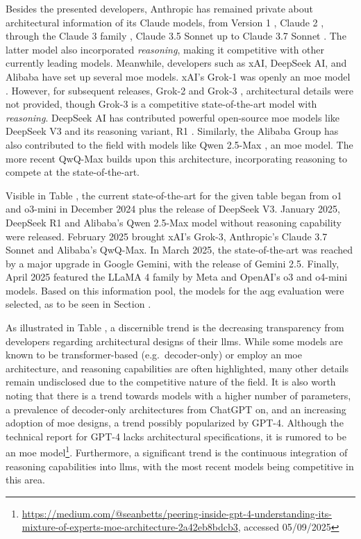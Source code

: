 Besides the presented developers, Anthropic has remained private about architectural information of its Claude models, from Version 1 \cite{anthropic_introducing_2023}, Claude 2 \cite{anthropic_claude_2023}, through the Claude 3 family \cite{anthropic_introducing_2024-1}, Claude 3.5 Sonnet \cite{anthropic_introducing_2024} up to Claude 3.7 Sonnet \cite{anthropic_claude_2025}. The latter model also incorporated \textit{reasoning}, making it competitive with other currently leading models. Meanwhile, developers such as xAI, DeepSeek AI, and Alibaba have set up several \ac{moe} models. xAI's Grok-1 was openly an \ac{moe} model \cite{xai_open_2024}. However, for subsequent releases, Grok-2 \cite{xai_grok-2_2024} and Grok-3 \cite{xai_grok_2025}, architectural details were not provided, though Grok-3 is a competitive state-of-the-art model with \textit{reasoning}. DeepSeek AI has contributed powerful open-source \ac{moe} models like DeepSeek V3 \cite{deepseek-ai_deepseek-v3_2025} and its reasoning variant, R1 \cite{deepseek-ai_deepseek-r1_2025}. Similarly, the Alibaba Group has also contributed to the field with models like Qwen 2.5-Max \cite{team_qwen25-max_2025}, an \ac{moe} model. The more recent QwQ-Max \cite{team_thinkthink_2025} builds upon this architecture, incorporating reasoning to compete at the state-of-the-art.

Visible in Table , the current state-of-the-art for the given table began from o1 and o3-mini in December 2024 plus the release of DeepSeek V3. January 2025, DeepSeek R1 and Alibaba's Qwen 2.5-Max model without reasoning capability were released. February 2025 brought xAI's Grok-3, Anthropic's Claude 3.7 Sonnet and Alibaba's QwQ-Max. In March 2025, the state-of-the-art was reached by a major upgrade in Google Gemini, with the release of Gemini 2.5. Finally, April 2025 featured the LLaMA 4 family by Meta and OpenAI's o3 and o4-mini models. Based on this information pool, the models for the \ac{aqg} evaluation were selected, as to be seen in Section . 

\pagebreak

 As illustrated in Table , a discernible trend is the decreasing transparency from developers regarding architectural designs of their \ac{llms}. While some models are known to be transformer-based (e.g.\ decoder-only) or employ an \ac{moe} architecture, and reasoning capabilities are often highlighted, many other details remain undisclosed due to the competitive nature of the field. It is also worth noting that there is a trend towards models with a higher number of parameters, a prevalence of decoder-only architectures from ChatGPT on, and an increasing adoption of \ac{moe} designs, a trend possibly popularized by GPT-4. Although the technical report for GPT-4 \cite{openai_gpt-4_2024} lacks architectural specifications, it is rumored to be an \ac{moe} model\footnote{\url{https://medium.com/@seanbetts/peering-inside-gpt-4-understanding-its-mixture-of-experts-moe-architecture-2a42eb8bdcb3}, accessed 05/09/2025}. Furthermore, a significant trend is the continuous integration of reasoning capabilities into \ac{llms}, with the most recent models being competitive in this area.

